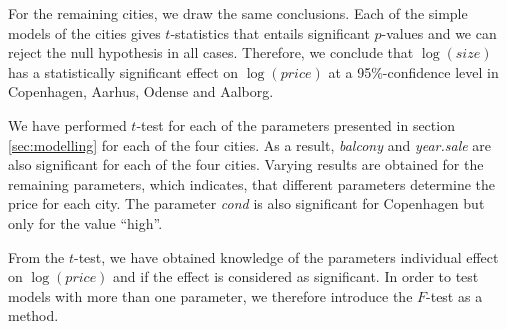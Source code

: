 For the remaining cities, we draw the same conclusions. 
Each of the simple models of the cities gives $t$-statistics that entails significant $p$-values and we can reject the null hypothesis in all cases. 
Therefore, we conclude that $\log(size)$ has a statistically significant effect on $\log(price)$ at a 95\%-confidence level in Copenhagen, Aarhus, Odense and Aalborg. 

We have performed $t$-test for each of the parameters presented in section \ref{sec:modelling} for each of the four cities. As a result, \textit{balcony} and \textit{year.sale} are also significant for each of the four cities. 
Varying results are obtained for the remaining parameters, which indicates, that different parameters determine the price for each city. The parameter \textit{cond} is also significant for Copenhagen but only for the value ``high''. 

From the $t$-test, we have obtained knowledge of the parameters individual effect on $\log(price)$ and if the effect is considered as significant. 
In order to test models with more than one parameter, we therefore introduce the $F$-test as a method.





